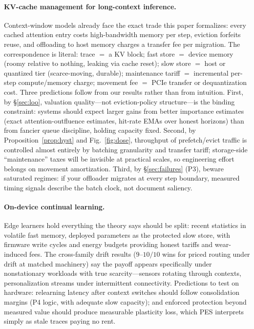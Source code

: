 \documentclass[10pt,twocolumn]{article}
\theoremstyle{definition}
\newcommand{\PES}{PES}
\begin{document}
\paragraph{{KV}-cache management for long-context inference.}
Context-window models already face the exact trade this paper formalizes: every cached attention entry costs
high-bandwidth memory per step, eviction forfeits reuse, and offloading to host memory charges a transfer
fee per migration. The correspondence is literal: trace $=$ a {KV} block; fast store $=$ device memory
(roomy relative to nothing, leaking via cache reset); slow store $=$ host or quantized tier (scarce-moving,
durable); maintenance tariff $=$ incremental per-step compute/memory charge; movement fee $=$ PCIe transfer
or dequantization cost. Three predictions follow from our results rather than from intuition.
First, by \S\ref{sec:loo}, valuation quality---not eviction-policy structure---is the binding constraint:
systems should expect larger gains from better importance estimates (exact attention-outfluence estimates,
hit-rate {EMA}s over honest horizons) than from fancier queue discipline, holding capacity fixed.
Second, by Proposition~\ref{prop:hyst} and Fig.~\ref{fig:dose}, throughput of prefetch/evict traffic is
controlled almost entirely by batching granularity and transfer tariff; storage-side ``maintenance'' taxes
will be invisible at practical scales, so engineering effort belongs on movement amortization. Third, by
\S\ref{sec:failures} (P3), beware saturated regimes: if your offloader migrates at every step boundary,
measured timing signals describe the batch clock, not document saliency.

\paragraph{On-device continual learning.}
Edge learners hold everything the theory says should be split: recent statistics in volatile fast memory,
deployed parameters as the protected slow store, with firmware write cycles and energy budgets providing
honest tariffs and wear-induced fees. The cross-family drift results ($9$--$10/10$ wins for priced routing
under drift at matched machinery) say the payoff appears specifically under nonstationary workloads with
true scarcity---sensors rotating through contexts, personalization streams under intermittent connectivity.
Predictions to test on hardware: relearning latency after context switches should follow consolidation
margins (P4 logic, with adequate slow capacity); and enforced protection beyond measured value should
produce measurable plasticity loss, which \PES{} interprets simply as stale traces paying no rent.
\end{document}
